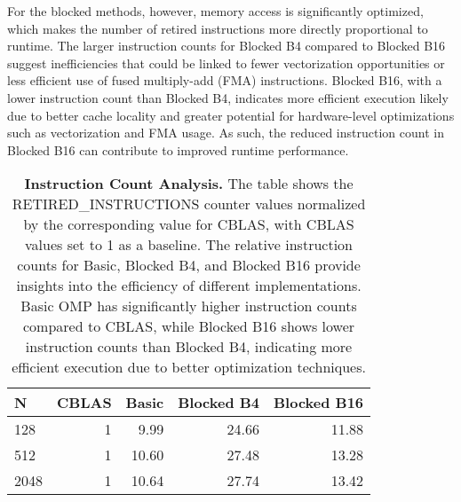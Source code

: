 For the blocked methods, however, memory access is significantly optimized, which makes the number of retired instructions more directly proportional to runtime. The larger instruction counts for Blocked B4 compared to Blocked B16 suggest inefficiencies that could be linked to fewer vectorization opportunities or less efficient use of fused multiply-add (FMA) instructions. Blocked B16, with a lower instruction count than Blocked B4, indicates more efficient execution likely due to better cache locality and greater potential for hardware-level optimizations such as vectorization and FMA usage. As such, the reduced instruction count in Blocked B16 can contribute to improved runtime performance.

\begin{table}[htbp]
    \centering
    \begin{tabular}{lrrrr}
    \toprule
    N &  CBLAS &  Basic &  Blocked B4 &  Blocked B16 \\
    \midrule
    128  &      1 &  9.99 &      24.66 &         11.88 \\
    512  &      1 & 10.60 &      27.48 &         13.28 \\
    2048 &      1 & 10.64 &      27.74 &         13.42 \\
    \bottomrule
    \end{tabular}
    \caption{\textbf{Instruction Count Analysis.} The table shows the RETIRED\_INSTRUCTIONS counter values normalized by the corresponding value for CBLAS, with CBLAS values set to 1 as a baseline. The relative instruction counts for Basic, Blocked B4, and Blocked B16 provide insights into the efficiency of different implementations. Basic OMP has significantly higher instruction counts compared to CBLAS, while Blocked B16 shows lower instruction counts than Blocked B4, indicating more efficient execution due to better optimization techniques.}
    \label{tab:instruction-count}
\end{table}